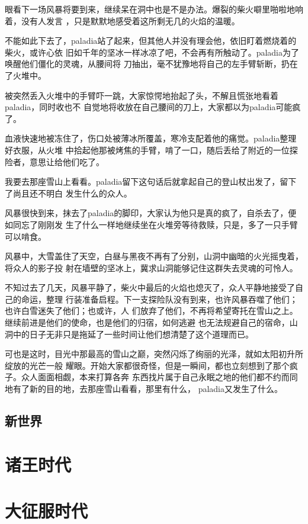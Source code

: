 \documentclass[UTF8]{ctexbook}
\begin{document}
眼看下一场风暴将要到来，继续呆在洞中也是不是办法。爆裂的柴火噼里啪啦地响着，没有人发言
，只是默默地感受着这所剩无几的火焰的温暖。

不能如此下去了，paladia站了起来，但其他人并没有理会他，依旧盯着燃烧着的柴火，或许心依
旧如千年的坚冰一样冰凉了吧，不会再有所触动了。paladia为了唤醒他们僵化的灵魂，从腰间将
刀抽出，毫不犹豫地将自己的左手臂斩断，扔在了火堆中。

被突然丢入火堆中的手臂吓一跳，大家惊愕地抬起了头，不解且慌张地看着paladia，同时收也不
自觉地将收放在自己腰间的刀上，大家都以为paladia可能疯了。

血液快速地被冻住了，伤口处被薄冰所覆盖，寒冷支配着他的痛觉。paladia整理好衣服，从火堆
中拾起他那被烤焦的手臂，啃了一口，随后丢给了附近的一位探险者，意思让给他们吃了。

我要去那座雪山上看看。paladia留下这句话后就拿起自己的登山杖出发了，留下了尚且还不明白
发生什么的众人。

风暴很快到来，抹去了paladia的脚印，大家认为他只是真的疯了，自杀去了，便如同忘了刚刚发
生了什么一样地继续坐在火堆旁等待救赎，只是，多了一只手臂可以啃食。

风暴中，大雪盖住了天空，白昼与黑夜不再有了分别，山洞中幽暗的火光摇曳着，将众人的影子投
射在墙壁的坚冰上，冀求山洞能够记住这群失去灵魂的可怜人。

不知过去了几天，风暴平静了，柴火中最后的火焰也熄灭了，众人平静地接受了自己的命运，整理
行装准备启程。下一支探险队没有到来，也许风暴吞噬了他们；也许白雪迷失了他们；也或许，人
们放弃了他们，不再将希望寄托在雪山之上。继续前进是他们的使命，也是他们的归宿，如何逃避
也无法规避自己的宿命，山洞中的日子无非只是拖延了一些时间让他们想清楚了这个道理而已。

可也是这时，目光中那最高的雪山之巅，突然闪烁了绚丽的光泽，就如太阳初升所绽放的光芒一般
耀眼。开始大家都很奇怪，但是一瞬间，都也立刻想到了那个疯子。众人面面相觑，本来打算各奔
东西找片属于自己永眠之地的他们都不约而同地有了新的目的地，去那座雪山看看，那里有什么，
paladia又发生了什么。

    \chapter{新世界}
\part{诸王时代}

\part{大征服时代}
\end{document}
